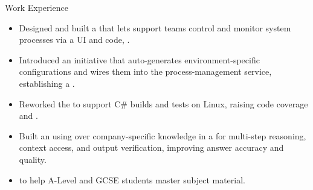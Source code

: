 \documentclass{cv}
\begin{document}
\begin{experienceSection}{Work Experience}
    \experienceItem[
        company={Qube Research \& Technologies (QRT)},
        position={Quantitative Technology Intern},
        duration={June 2024 -- June 2025}
    ]
    \begin{itemize}
        \item Designed and built a  that lets support teams control and monitor system processes via a UI and code, .
        \item Introduced an  initiative that auto-generates environment-specific configurations and wires them into the process-management service, establishing a .
        \item Reworked the  to support C\# builds and tests on Linux, raising code coverage and .
        \item Built an  using  over company-specific knowledge in a  for multi-step reasoning, context access, and output verification, improving answer accuracy and quality.
    \end{itemize}

    \experienceItem[
        company={MyTutor},
        position={A-Level and GCSE Tutor},
        duration={Jan. 2023 -- June 2024}
    ]
    \begin{itemize}
        \item {} to help A-Level and GCSE students master subject material.
    \end{itemize}
\end{experienceSection}
\end{document}
